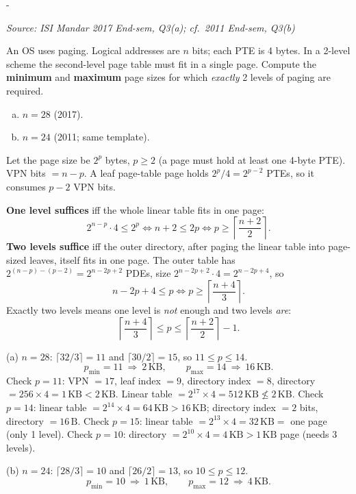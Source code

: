 \documentclass[11pt,a4paper]{article}
\makeatletter
\newcommand{\keepspace}[1]{\par\penalty-100\begingroup
  \setlength{\dimen@}{#1}\dimen@ii\pagegoal\advance\dimen@ii-\pagetotal
  \ifdim\dimen@>\dimen@ii\ifdim\dimen@ii>\z@\vfil\fi\break\fi\endgroup}
\newcounter{qn}[section]
\newenvironment{Qn}[4]{%
  \refstepcounter{qn}\keepspace{7\baselineskip}%
  \begin{tcolorbox}[qboxstyle, title={Q\thesection.\theqn\ \ [#1 \textbar\ #2]\ \ #4}]%
  {\footnotesize\color{g3}\textit{Source: #3}}\par\smallskip%
}{%
  \end{tcolorbox}%
}
\newenvironment{Sol}{%
  \begin{tcolorbox}[sboxstyle, title={Solution}]%
}{%
  \end{tcolorbox}\vspace{0.35em}%
}
\makeatother
\begin{document}
\begin{Qn}{Hard}{Lect 14}{ISI Mandar 2017 End-sem, Q3(a); cf.\ 2011 End-sem, Q3(b)}{Min/max page size for exactly two paging levels}
An OS uses paging. Logical addresses are $n$ bits; each PTE is 4 bytes.
In a 2-level scheme the second-level page table must fit in a single
page. Compute the \textbf{minimum} and \textbf{maximum} page sizes for
which \emph{exactly} 2 levels of paging are required.
\begin{enumerate}[(a)]
\item $n=28$ (2017).
\item $n=24$ (2011; same template).
\end{enumerate}
\end{Qn}
\begin{Sol}
Let the page size be $2^{p}$ bytes, $p\ge 2$ (a page must hold at least
one 4-byte PTE). VPN bits $= n-p$. A leaf page-table page holds
$2^{p}/4 = 2^{p-2}$ PTEs, so it consumes $p-2$ VPN bits.

\textbf{One level suffices} iff the whole linear table fits in one page:
\[
2^{n-p}\cdot 4 \le 2^{p} \iff n+2 \le 2p \iff p \ge \left\lceil\frac{n+2}{2}\right\rceil.
\]
\textbf{Two levels suffice} iff the outer directory, after paging the
linear table into page-sized leaves, itself fits in one page. The outer
table has $2^{(n-p)-(p-2)} = 2^{n-2p+2}$ PDEs, size
$2^{n-2p+2}\cdot 4 = 2^{n-2p+4}$, so
\[
n-2p+4 \le p \iff p \ge \left\lceil\frac{n+4}{3}\right\rceil.
\]
Exactly two levels means one level is \emph{not} enough and two levels
\emph{are}:
\[
\left\lceil\frac{n+4}{3}\right\rceil \le p \le
\left\lceil\frac{n+2}{2}\right\rceil - 1.
\]

(a) $n=28$: $\lceil 32/3\rceil=11$ and $\lceil 30/2\rceil=15$, so
$11\le p\le 14$.
\[
p_{\min}=11\ \Rightarrow\ 2\,\mathrm{KB},\qquad
p_{\max}=14\ \Rightarrow\ 16\,\mathrm{KB}.
\]
Check $p=11$: VPN $=17$, leaf index $=9$, directory index $=8$,
directory $=256\times 4=1\,\mathrm{KB} < 2\,\mathrm{KB}$. Linear table
$=2^{17}\times 4=512\,\mathrm{KB} \not\le 2\,\mathrm{KB}$.
Check $p=14$: linear table $=2^{14}\times 4=64\,\mathrm{KB} > 16\,\mathrm{KB}$;
directory index $=2$ bits, directory $=16\,\mathrm{B}$.
Check $p=15$: linear table $=2^{13}\times 4=32\,\mathrm{KB}=$ one page
(only 1 level). Check $p=10$: directory $=2^{10}\times 4=4\,\mathrm{KB}
> 1\,\mathrm{KB}$ page (needs 3 levels).

(b) $n=24$: $\lceil 28/3\rceil=10$ and $\lceil 26/2\rceil=13$, so
$10\le p\le 12$.
\[
p_{\min}=10\ \Rightarrow\ 1\,\mathrm{KB},\qquad
p_{\max}=12\ \Rightarrow\ 4\,\mathrm{KB}.
\]
\end{Sol}
\end{document}
